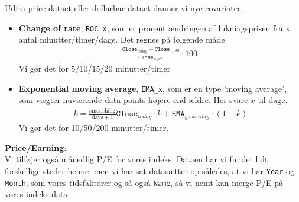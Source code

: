 \documentclass[a4paper,danish,12pt]{article}
\begin{document}
Udfra price-dataet eller dollarbar-dataet danner vi nye covariater. 
\begin{itemize}
	\item \textbf{Change of rate}, \texttt{ROC\_x}, som er procent ændringen af lukningsprisen fra x antal minutter/timer/dage. Det regnes på følgende måde
	\begin{align*}
		\frac{\texttt{Close}_{today}-\texttt{Close}_{x\_old}}{\texttt{Close}_{x\_old}} \cdot 100.
	\end{align*}
	Vi gør det for 5/10/15/20 minutter/timer
	\item \textbf{Exponential moving average}, \texttt{EMA\_x}, som er en type 'moving average', som vægter nuværende data points højere end ældre. Her svare $x$ til dage.
	\begin{align*}
		k = \frac{\text{smoothing}}{\text{days} + 1}
		\texttt{Close}_{today}\cdot k + \texttt{EMA}_{yesterday}\cdot(1-k)
	\end{align*}
	Vi gør det for 10/50/200 minutter/timer.
\end{itemize}
\textbf{Price/Earning}:\\
Vi tilføjer også månedlig P/E for vores indeks. Dataen har vi fundet lidt forskellige steder henne, men vi har sat datasættet op således, at vi har \texttt{Year} og \texttt{Month}, som vores tidsfaktorer og så også \texttt{Name}, så vi nemt kan merge P/E på vores indeks data.
\end{document}
